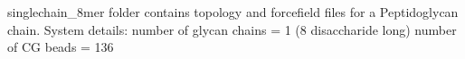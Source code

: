 singlechain_8mer folder contains topology and forcefield files for a Peptidoglycan chain.
System details:
number of glycan chains = 1 (8 disaccharide long)
number of CG beads = 136
